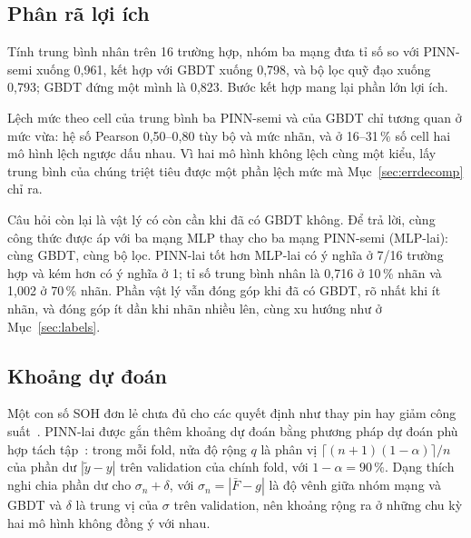 \documentclass[12pt,a4paper,oneside]{report}
\theoremstyle{plain}
\theoremstyle{definition}
\begin{document}
\subsection{Phân rã lợi ích}\label{sec:e20steps}

Tính trung bình nhân trên 16 trường hợp, nhóm ba mạng đưa tỉ số so với
PINN-semi xuống 0{,}961, kết hợp với GBDT xuống 0{,}798, và bộ lọc quỹ đạo xuống 0{,}793; GBDT đứng một mình
là 0{,}823. Bước kết hợp mang lại phần lớn lợi ích.



Lệch mức theo cell của trung bình ba PINN-semi và của GBDT chỉ tương quan ở mức vừa: hệ số Pearson 0{,}50--0{,}80 tùy bộ và mức nhãn,
và ở 16--31\,\% số cell hai mô hình lệch ngược dấu nhau. Vì hai mô hình không lệch cùng một kiểu, lấy trung bình của chúng triệt tiêu được một phần lệch mức mà Mục~\ref{sec:errdecomp} chỉ ra.

Câu hỏi còn lại là vật lý có còn cần khi đã có GBDT không. Để trả lời, cùng công thức được áp với ba mạng MLP thay
cho ba mạng PINN-semi (MLP-lai): cùng GBDT, cùng bộ lọc. PINN-lai tốt hơn MLP-lai có ý nghĩa ở 7/16 trường
hợp và kém hơn có ý nghĩa ở 1; tỉ số trung bình nhân là 0{,}716 ở 10\,\% nhãn và 1{,}002 ở
70\,\% nhãn. Phần vật lý vẫn đóng góp khi đã có GBDT, rõ nhất khi ít nhãn, và đóng góp ít dần khi nhãn nhiều lên, cùng xu hướng như ở Mục~\ref{sec:labels}.

\subsection{Khoảng dự đoán}\label{sec:conformal}

Một con số SOH đơn lẻ chưa đủ cho các quyết định như thay pin hay giảm công suất~\cite{thelen2024}. PINN-lai được
gắn thêm khoảng dự đoán bằng phương pháp dự đoán phù hợp tách tập~\cite{vovk2005,lei2018}: trong mỗi fold, nửa độ
rộng $q$ là phân vị $\lceil (n+1)(1-\alpha) \rceil / n$ của phần dư $|\tilde y - y|$ trên validation của chính fold,
với $1 - \alpha = 90\,\%$. Dạng thích nghi chia phần dư cho $\sigma_n + \delta$, với $\sigma_n = |\bar F - g|$ là độ
vênh giữa nhóm mạng và GBDT và $\delta$ là trung vị của $\sigma$ trên validation, nên khoảng rộng ra ở những chu kỳ hai
mô hình không đồng ý với nhau.
\end{document}
